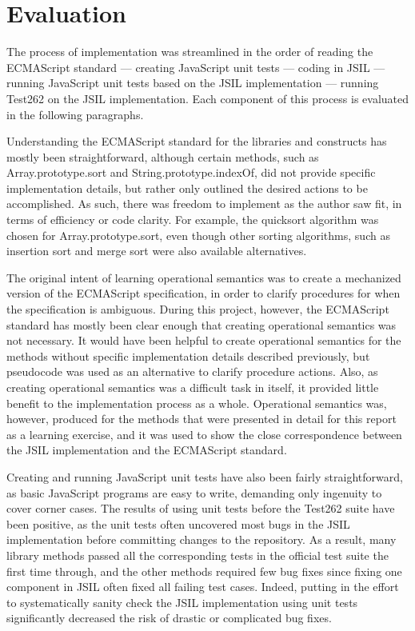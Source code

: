 \documentclass[a4paper,11pt,twoside]{report}
\begin{document}
\section{Evaluation}
The process of implementation was streamlined in the order of reading the ECMAScript standard --- creating JavaScript unit tests --- coding in JSIL --- running JavaScript unit tests based on the JSIL implementation --- running Test262 on the JSIL implementation. Each component of this process is evaluated in the following paragraphs.

Understanding the ECMAScript standard for the libraries and constructs has mostly been straightforward, although certain methods, such as Array.prototype.sort and String.prototype.indexOf, did not provide specific implementation details, but rather only outlined the desired actions to be accomplished. As such, there was freedom to implement as the author saw fit, in terms of efficiency or code clarity. For example, the quicksort algorithm was chosen for Array.prototype.sort, even though other sorting algorithms, such as insertion sort and merge sort were also available alternatives.

The original intent of learning operational semantics was to create a mechanized version of the ECMAScript specification, in order to clarify procedures for when the specification is ambiguous. During this project, however, the ECMAScript standard has mostly been clear enough that creating operational semantics was not necessary. It would have been helpful to create operational semantics for the methods without specific implementation details described previously, but pseudocode was used as an alternative to clarify procedure actions. Also, as creating operational semantics was a difficult task in itself, it provided little benefit to the implementation process as a whole. Operational semantics was, however, produced for the methods that were presented in detail for this report as a learning exercise, and it was used to show the close correspondence between the JSIL implementation and the ECMAScript standard.

Creating and running JavaScript unit tests have also been fairly straightforward, as basic JavaScript programs are easy to write, demanding only ingenuity to cover corner cases. The results of using unit tests before the Test262 suite have been positive, as the unit tests often uncovered most bugs in the JSIL implementation before committing changes to the repository. As a result, many library methods passed all the corresponding tests in the official test suite the first time through, and the other methods required few bug fixes since fixing one component in JSIL often fixed all failing test cases. Indeed, putting in the effort to systematically sanity check the JSIL implementation using unit tests significantly decreased the risk of drastic or complicated bug fixes.
\end{document}
